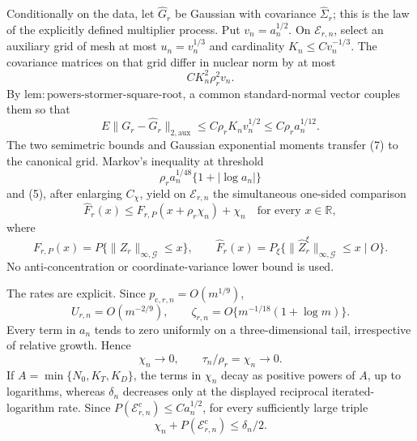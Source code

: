 Conditionally on the data, let \(\widehat G_r\) be Gaussian with covariance \(\widehat\Sigma_r\); this is the law of the explicitly defined multiplier process.  Put \(v_n=a_n^{1/2}\).  On \(\mathcal E_{r,n}\), select an auxiliary grid of mesh at most \(u_n=v_n^{1/3}\) and cardinality \(K_n\le Cv_n^{-1/3}\).  The covariance matrices on that grid differ in nuclear norm by at most
\[
 CK_n^2\rho_r^2v_n.                                     \tag{6}
\]
By \(\mathrm{lem:powers\mbox{-}stormer\mbox{-}square\mbox{-}root}\), a common standard-normal vector couples them so that
\[
 E\|G_r-\widehat G_r\|_{2,\mathrm{aux}}
 \le C\rho_rK_nv_n^{1/2}\le C\rho_ra_n^{1/12}.         \tag{7}
\]
The two semimetric bounds and Gaussian exponential moments transfer (7) to the canonical grid.  Markov's inequality at threshold
\[
 \rho_ra_n^{1/48}\{1+|\log a_n|\}                     \tag{8}
\]
and (5), after enlarging \(C_\chi\), yield on \(\mathcal E_{r,n}\) the simultaneous one-sided comparison
\[
 \widehat F_r(x)
 \le F_{r,P}(x+\rho_r\chi_n)+\chi_n
 \quad\text{for every }x\in\mathbb R,                  \tag{9}
\]
where
\[
 F_{r,P}(x)=P\{\|Z_r\|_{\infty,\mathcal G}\le x\},
 \qquad
 \widehat F_r(x)=P_\xi\{\|\widehat Z_r^\xi\|_{\infty,\mathcal G}\le x\mid O\}.
\]
No anti-concentration or coordinate-variance lower bound is used.

The rates are explicit.  Since \(p_{\mathrm c,r,n}=O(m^{1/9})\),
\[
 U_{r,n}=O(m^{-2/9}),
 \qquad \zeta_{r,n}=O\{m^{-1/18}(1+\log m)\}.           \tag{10}
\]
Every term in \(a_n\) tends to zero uniformly on a three-dimensional tail, irrespective of relative growth.  Hence
\[
 \chi_n\longrightarrow0,
 \qquad \tau_n/\rho_r=\chi_n\longrightarrow0.          \tag{11}
\]
If \(A=\min\{N_0,K_T,K_D\}\), the terms in \(\chi_n\) decay as positive powers of \(A\), up to logarithms, whereas \(\delta_n\) decreases only at the displayed reciprocal iterated-logarithm rate.  Since \(P(\mathcal E_{r,n}^c)\le Ca_n^{1/2}\), for every sufficiently large triple
\[
 \chi_n+P(\mathcal E_{r,n}^c)\le\delta_n/2.             \tag{12}
\]

